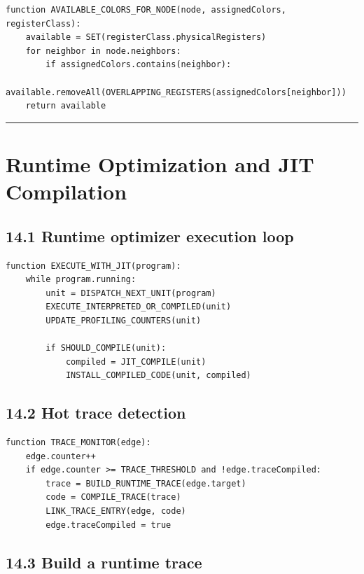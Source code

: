 \documentclass[10pt,letterpaper]{article}
\begin{document}
\begin{verbatim}
function AVAILABLE_COLORS_FOR_NODE(node, assignedColors, registerClass):
    available = SET(registerClass.physicalRegisters)
    for neighbor in node.neighbors:
        if assignedColors.contains(neighbor):
            available.removeAll(OVERLAPPING_REGISTERS(assignedColors[neighbor]))
    return available
\end{verbatim}

\medskip\hrule\medskip

\clearpage
\section{Runtime Optimization and JIT Compilation}

\subsection*{14.1 Runtime optimizer execution loop}
{}

\begin{verbatim}
function EXECUTE_WITH_JIT(program):
    while program.running:
        unit = DISPATCH_NEXT_UNIT(program)
        EXECUTE_INTERPRETED_OR_COMPILED(unit)
        UPDATE_PROFILING_COUNTERS(unit)

        if SHOULD_COMPILE(unit):
            compiled = JIT_COMPILE(unit)
            INSTALL_COMPILED_CODE(unit, compiled)
\end{verbatim}

\subsection*{14.2 Hot trace detection}
{}

\begin{verbatim}
function TRACE_MONITOR(edge):
    edge.counter++
    if edge.counter >= TRACE_THRESHOLD and !edge.traceCompiled:
        trace = BUILD_RUNTIME_TRACE(edge.target)
        code = COMPILE_TRACE(trace)
        LINK_TRACE_ENTRY(edge, code)
        edge.traceCompiled = true
\end{verbatim}

\subsection*{14.3 Build a runtime trace}
{}
\end{document}
